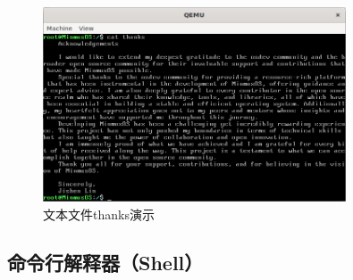 \begin{figure}[htbp]
    \centering
    \includegraphics[width=0.8\textwidth]{figures/ThanksFilePresentation.png}
    \caption{文本文件thanks演示}
    \label{fig:ThanksFilePresentation}
\end{figure}

\subsection{命令行解释器（Shell）}
